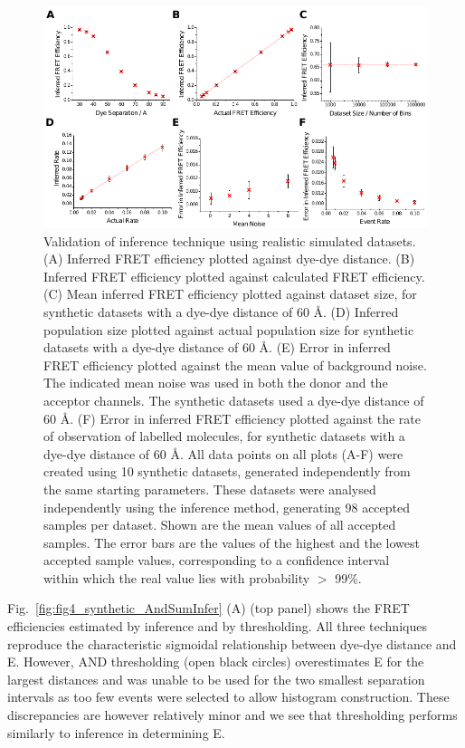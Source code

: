 \begin{figure}
   \begin{center}
      \includegraphics*[width=6in]{inference/fig3_benchmark_synthetic.pdf}
      \caption{Validation of inference technique using realistic simulated datasets.  (A) Inferred FRET efficiency plotted against dye-dye distance.  (B) Inferred FRET efficiency plotted against calculated FRET efficiency. (C) Mean inferred FRET efficiency plotted against dataset size, for synthetic datasets with a dye-dye distance of 60 \AA. (D) Inferred population size plotted against actual population size for synthetic datasets with a dye-dye distance of 60 \AA. (E) Error in inferred FRET efficiency plotted against the mean value of background noise. The indicated mean noise was used in both the donor and the acceptor channels. The synthetic datasets used a dye-dye distance of 60 \AA. (F) Error in inferred FRET efficiency plotted against the rate of observation of labelled molecules, for synthetic datasets with a dye-dye distance of 60 \AA.  All data points on all plots (A-F) were created using 10 synthetic datasets, generated independently from the same starting parameters.  These datasets were analysed independently using the inference method, generating 98 accepted samples per dataset.  Shown are the mean values of all accepted samples.  The error bars are the values of the highest and the lowest accepted sample values, corresponding to a confidence interval within which the real value lies with probability $>$ 99\%.}
      \label{fig:fig3_benchmark_synthetic}
   \end{center}
\end{figure}

Fig.~\ref{fig:fig4_synthetic_AndSumInfer} (A) (top panel) shows the FRET efficiencies estimated by inference and by thresholding.  All three techniques reproduce the characteristic sigmoidal relationship between dye-dye distance and E.  However, AND thresholding (open black circles) overestimates E for the largest distances and was unable to be used for the two smallest separation intervals as too few events were selected to allow histogram construction. These discrepancies are however relatively minor and we see that thresholding performs similarly to inference in determining E.   

